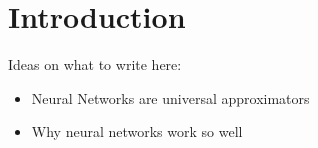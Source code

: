 \section{Introduction}

Ideas on what to write here:
\begin{itemize}
	\item Neural Networks are universal approximators
	\item Why neural networks work so well \cite{lin17}
\end{itemize}